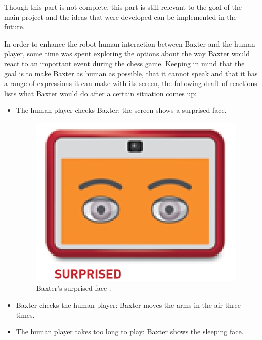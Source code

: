 \documentclass{l4proj}
\begin{document}
Though this part is not complete, this part is still relevant to the goal of the main project and the ideas that were developed can be implemented in the future. 

In order to enhance the robot-human interaction between Baxter and the human player, some time was spent exploring the options about the way Baxter would react to an important event during the chess game. Keeping in mind that the goal is to make Baxter as human as possible, that it cannot speak and that it has a range of expressions it can make with its screen, the following draft of reactions lists what Baxter would do after a certain situation comes up:

\begin{itemize}
	\vspace{-5mm}
	\item The human player checks Baxter: the screen shows a surprised face.
	
	\begin{figure}[h!]
	\centering
	\includegraphics[scale=0.24]{surprised_face.jpg}
	\caption{Baxter's surprised face \cite{BaxterFaces}.}
	\label{SurprisedFace}
	\end{figure}

	\item Baxter checks the human player: Baxter moves the arms in the air three times.
	
	\item The human player takes too long to play: Baxter shows the sleeping face.
	

\end{itemize}
\end{document}
